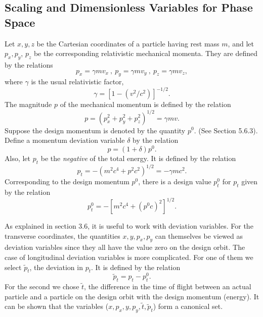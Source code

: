 \subsection{Scaling and Dimensionless Variables for Phase Space}
     Let $x,y,z$ be the Cartesian coordinates of a particle having rest
mass $m$, and let $p_x, p_y$, $p_z$ be the corresponding relativistic
mechanical momenta.  They are defined by the relations
\begin{equation}
      p_x = \gamma m v_x \ , \ p_y = \gamma m v_y \ , \ p_z = \gamma m v_z,
\end{equation}
where $\gamma$ is the usual relativistic factor,
\begin{equation}
\gamma = [1 - (v^2/c^2)]^{-1/2}.
\end{equation}
The magnitude $p$ of the mechanical momentum is defined by the relation
\begin{equation}
p = (p^2_x + p^2_y + p^2_z)^{1/2} = \gamma mv.
\end{equation}
Suppose the design momentum is denoted by the quantity $p^0$.  (See Section 5.6.3).  Define a
momentum deviation variable $\delta$ by the relation  
\begin{equation}
p = (1 + \delta) p^0.
\end{equation}
Also, let $p_t$ be the {\em negative} of the total energy.  It is defined by
the relation
\begin{equation}
p_t = -(m^2c^4 + p^2c^2)^{1/2} = -\gamma mc^2.
\end{equation}
Corresponding to the design momentum $p^0$, there is a design value
$p^0_t$ for $p_t$ given by the relation
\begin{equation}
p^0_t = -[m^2c^4 + (p^0c)^2]^{1/2}.
\end{equation}

     As explained in section 3.6, it is useful to work with deviation
variables.  For the transverse coordinates, the quantities $x,y,p_x,p_y$
can themselves be viewed as deviation variables since they all have the
value zero on the design orbit.  The case of longitudinal deviation variables is
more complicated.  For one of them we select $\tilde{p}_t$, the deviation
in $p_t$.  It is defined by the relation
\begin{equation}
\tilde{p}_t = p_t - p_t^0.
\end{equation}
For the second we chose $\tilde{t}$, the difference in the time of flight
between an actual particle and a particle on the design orbit with the
design momentum (energy).  It can be shown that the variables
($x,p_x,y,p_y,\tilde{t},\tilde{p}_t$) form a canonical set. 

